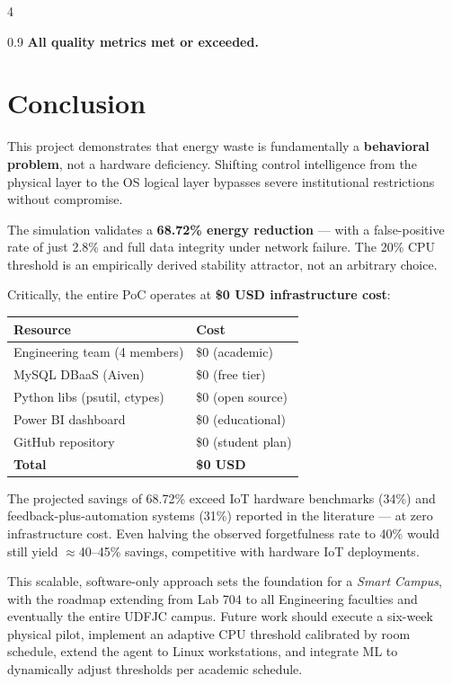 \documentclass[a0,landscape]{a0poster}
\begin{document}
\begin{multicols}{4}
\begin{spacing}{0.9}
{\large \textbf{All quality metrics met or exceeded.}}


\section*{Conclusion}

{\large This project demonstrates that energy waste is fundamentally a \textbf{behavioral problem}, not a hardware deficiency. Shifting control intelligence from the physical layer to the OS logical layer bypasses severe institutional restrictions without compromise.

The simulation validates a \textbf{68.72\% energy reduction} — with a false-positive rate of just 2.8\% and full data integrity under network failure. The 20\% CPU threshold is an empirically derived stability attractor, not an arbitrary choice.

Critically, the entire PoC operates at \textbf{\$0 USD infrastructure cost}:}

\vspace{0.3cm}
\begin{center}
{\large
\begin{tabular}{@{}ll@{}}
\toprule
\textbf{Resource} & \textbf{Cost} \\
\midrule
Engineering team (4 members) & \$0 (academic) \\
MySQL DBaaS (Aiven) & \$0 (free tier) \\
Python libs (psutil, ctypes) & \$0 (open source) \\
Power BI dashboard & \$0 (educational) \\
GitHub repository & \$0 (student plan) \\
\midrule
\textbf{Total} & \textbf{\$0 USD} \\
\bottomrule
\end{tabular}
}
\end{center}

\vspace{0.3cm}
{\large The projected savings of 68.72\% exceed IoT hardware benchmarks (34\%) and feedback-plus-automation systems (31\%) reported in the literature — at zero infrastructure cost. Even halving the observed forgetfulness rate to 40\% would still yield $\approx$40--45\% savings, competitive with hardware IoT deployments.

This scalable, software-only approach sets the foundation for a \textit{Smart Campus}, with the roadmap extending from Lab 704 to all Engineering faculties and eventually the entire UDFJC campus. Future work should execute a six-week physical pilot, implement an adaptive CPU threshold calibrated by room schedule, extend the agent to Linux workstations, and integrate ML to dynamically adjust thresholds per academic schedule.}


\end{spacing}
\end{multicols}
\end{document}
